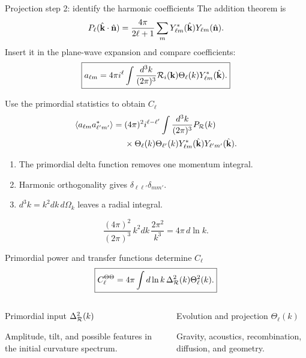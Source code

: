 \begin{frame}{Projection step 2: identify the harmonic coefficients}
The addition theorem is
\[P_\ell(\hat{\mathbf k}\cdot\hat{\mathbf n})=\frac{4\pi}{2\ell+1}
\sum_mY^*_{\ell m}(\hat{\mathbf k})Y_{\ell m}(\hat{\mathbf n}).\]
Insert it in the plane-wave expansion and compare coefficients:
\[\boxed{a_{\ell m}=4\pi i^\ell\int\frac{d^3k}{(2\pi)^3}
\mathcal R_i(\mathbf k)\Theta_\ell(k)Y^*_{\ell m}(\hat{\mathbf k}).}\]
\end{frame}

\begin{frame}{Use the primordial statistics to obtain $C_\ell$}
\small
\[
\begin{aligned}
\langle a_{\ell m}a^*_{\ell'm'}\rangle
={}&(4\pi)^2i^{\ell-\ell'}
\int\frac{d^3k}{(2\pi)^3}P_{\mathcal R}(k)\\
&\times\Theta_\ell(k)\Theta_{\ell'}(k)
Y^*_{\ell m}(\hat{\mathbf k})Y_{\ell'm'}(\hat{\mathbf k}).
\end{aligned}
\]
\normalsize
\begin{enumerate}
\item The primordial delta function removes one momentum integral.
\item Harmonic orthogonality gives $\delta_{\ell\ell'}\delta_{mm'}$.
\item $d^3k=k^2dk\,d\Omega_k$ leaves a radial integral.
\end{enumerate}
\[\frac{(4\pi)^2}{(2\pi)^3}\,k^2dk\,\frac{2\pi^2}{k^3}
=4\pi\,d\ln k.\]
\end{frame}

\begin{frame}{Primordial power and transfer functions determine $C_\ell$}
\[\boxed{C_\ell^{\Theta\Theta}=4\pi\int d\ln k\,
\Delta_{\mathcal R}^2(k)\Theta_\ell^2(k).}\]
\begin{columns}[T]
\begin{block}{Primordial input}
$\Delta_{\mathcal R}^2(k)$\par\medskip
Amplitude, tilt, and possible features in the initial curvature spectrum.
\end{block}
\begin{block}{Evolution and projection}
$\Theta_\ell(k)$\par\medskip
Gravity, acoustics, recombination, diffusion, and geometry.
\end{block}
\end{columns}
\end{frame}

